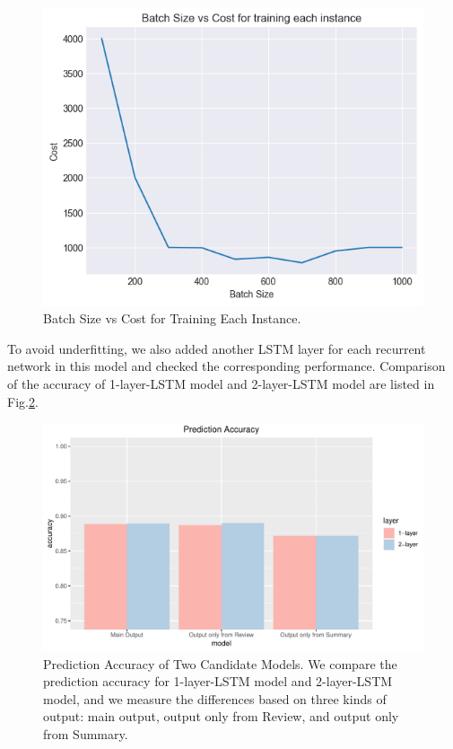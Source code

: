 \documentclass[letterpaper]{article} %
\begin{document}
\begin{figure}[!h]
\centering
\includegraphics[width=0.9\columnwidth]{report/pics/pr_batch.png}
\caption{Batch Size vs Cost for Training Each Instance.}
\label{batch_size}
\end{figure}

 To avoid underfitting, we also added another LSTM layer for each recurrent network in this model and checked the corresponding performance. Comparison of the accuracy of 1-layer-LSTM model and 2-layer-LSTM model are listed in Fig.\ref{predAcc}.

\begin{figure}[!h]
\centering
\includegraphics[width=1.0\columnwidth]{report/plot_acc.pdf}
\caption{Prediction Accuracy of Two Candidate Models. We compare the prediction accuracy for 1-layer-LSTM model and 2-layer-LSTM model, and we measure the differences based on three kinds of output: main output, output only from Review, and output only from Summary. }
\label{predAcc}
\end{figure}
\end{document}
